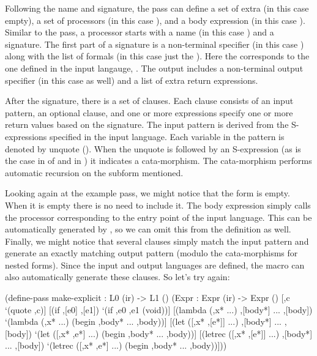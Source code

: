 \documentclass[letterpaper,10pt]{article}
\begin{document}
Following the name and signature, the pass can define a set of extra
 (in this case empty), a set of processors (in this case
), and a body expression (in this
case ).
Similar to the pass, a processor starts with a name (in this case
) and a signature.
The first part of a signature is a non-terminal specifier (in this case
) along with the list of formals (in this case just the
).
Here the  corresponds to the one defined in the input langauge,
.
The output includes a non-terminal output specifier (in this case 
as well) and a list of extra return expressions.

After the signature, there is a set of clauses.
Each clause consists of an input pattern, an optional clause, and one or more
expressions specify one or more return values based on the signature.
The input pattern is derived from the S-expressions specified in the input
language.
Each variable in the pattern is denoted by unquote (\scheme{,}).
When the unquote is followed by an S-expression (as is the case in of
\scheme{,[e*]} and \scheme{,[e]} in ) it
indicates a cata-morphism.
The cata-morphism performs automatic recursion on the subform mentioned.

Looking again at the example pass, we might notice that the
 form is empty.
When it is empty there is no need to include it.
The body expression  simply calls the processor corresponding
to the entry point of the input language.
This can be automatically generated by , so we can omit
this from the definition as well.
Finally, we might notice that several clauses simply match the input pattern
and generate an exactly matching output pattern (modulo the cata-morphisms for
nested  forms).
Since the input and output languages are defined, the 
macro can also automatically generate these clauses.
So let's try again:

\begin{schemedisplay}
(define-pass make-explicit : L0 (ir) -> L1 ()
  (Expr : Expr (ir) -> Expr ()
    [,c `(quote ,c)]
    [(if ,[e0] ,[e1]) `(if ,e0 ,e1 (void))]
    [(lambda (,x* ...) ,[body*] ... ,[body])
     `(lambda (,x* ...) (begin ,body* ... ,body))]
    [(let ([,x* ,[e*]] ...) ,[body*] ... ,[body])
     `(let ([,x* ,e*] ...) (begin ,body* ... ,body))]
    [(letrec ([,x* ,[e*]] ...) ,[body*] ... ,[body])
     `(letrec ([,x* ,e*] ...) (begin ,body* ... ,body))]))
\end{schemedisplay}
\end{document}
